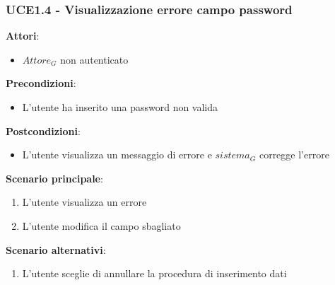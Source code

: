 \subsubsection{UCE1.4 - Visualizzazione errore campo password}
\textbf{Attori}:
\begin{itemize}
    \item $\textit{Attore}_G$ non autenticato
\end{itemize}
\textbf{Precondizioni}:
\begin{itemize}
    \item L'utente ha inserito una password non valida
\end{itemize}
\textbf{Postcondizioni}:
\begin{itemize}
    \item L'utente visualizza un messaggio di errore e $\textit{sistema}_G$ corregge l'errore
\end{itemize}
\textbf{Scenario principale}:
\begin{enumerate}
    \item L'utente visualizza un errore 
    \item L'utente modifica il campo sbagliato
\end{enumerate}
\textbf{Scenario alternativi}:
\begin{enumerate}
    \item L'utente sceglie di annullare la procedura di inserimento dati
\end{enumerate}